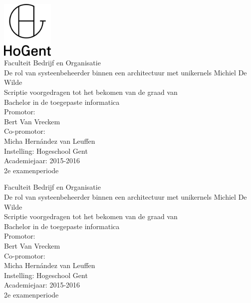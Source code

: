 \documentclass[pdftex,a4paper,12pt,twoside]{report}
\newcommand{\emptypage}{
\newpage
\thispagestyle{empty}
\mbox{}
\newpage
}
\newcommand{\student}{Michiel De Wilde}
\newcommand{\promotor}{Bert Van Vreckem}
\newcommand{\copromotor}{Micha Hernández van Leuffen}
\newcommand{\instelling}{Hogeschool Gent}
\newcommand{\titel}{De rol van systeenbeheerder binnen een architectuur met
unikernels}
\newcommand{\faculteit}{Faculteit Bedrijf en Organisatie}
\newcommand{\rapporttype}{Scriptie voorgedragen tot het bekomen van de graad van\\Bachelor in de toegepaste informatica}
\newcommand{\academiejaar}{2015-2016}
\newcommand{\examenperiode}{2e examenperiode}
\begin{document}

\begin{titlepage}
  \begin{center}

    \begingroup
    \rmfamily
    \includegraphics[width=2.5cm]{img/HG-beeldmerk-woordmerk}\\[.5cm]
    \faculteit\\[3cm]
    \titel
    \vfill
    \student\\[3.5cm]
    \rapporttype\\[2cm]
    Promotor:\\
    \promotor\\
    Co-promotor:\\
    \copromotor\\[2.5cm]
    Instelling: \instelling\\[.5cm]
    Academiejaar: \academiejaar\\[.5cm]
    \examenperiode
    \endgroup

  \end{center}
  \restoregeometry
\end{titlepage}


\emptypage


\begin{titlepage}
  \begin{center}

    \begingroup
    \rmfamily
    \faculteit\\[3cm]
    \titel
    \vfill
    \student\\[3.5cm]
    \rapporttype\\[2cm]
    Promotor:\\
    \promotor\\
    Co-promotor:\\
    \copromotor\\[2.5cm]
    Instelling: \instelling\\[.5cm]
    Academiejaar: \academiejaar\\[.5cm]
    \examenperiode
    \endgroup

  \end{center}
  \restoregeometry
\end{titlepage}
\end{document}
